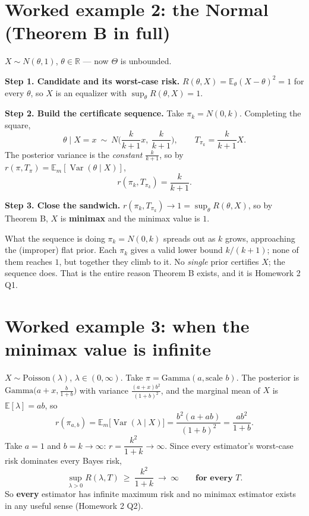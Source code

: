 \documentclass[11pt]{article}
\newcommand{\E}{\mathbb{E}}
\newcommand{\Var}{\operatorname{Var}}
\newcommand{\R}{\mathbb{R}}
\begin{document}
\section{Worked example 2: the Normal (Theorem B in full)}

$X\sim N(\theta,1)$, $\theta\in\R$ --- now $\Theta$ is unbounded.

\textbf{Step 1. Candidate and its worst-case risk.} $R(\theta,X)=\E_\theta(X-\theta)^2=1$ for
every $\theta$, so $X$ is an equalizer with $\sup_\theta R(\theta,X)=1$.

\textbf{Step 2. Build the certificate sequence.} Take $\pi_k=N(0,k)$. Completing the square,
\[
\theta\mid X=x\ \sim\ N\Big(\frac{k}{k+1}x,\ \frac{k}{k+1}\Big),
\qquad T_{\pi_k}=\frac{k}{k+1}X .
\]
The posterior variance is the \emph{constant} $\frac{k}{k+1}$, so by
$r(\pi,T_\pi)=\E_m[\Var(\theta\mid X)]$,
\[
r(\pi_k,T_{\pi_k})=\frac{k}{k+1}.
\]

\textbf{Step 3. Close the sandwich.} $r(\pi_k,T_{\pi_k})\to1=\sup_\theta R(\theta,X)$, so by
Theorem B, $X$ is \textbf{minimax} and the minimax value is $1$.

\begin{idea}{What the sequence is doing}
$\pi_k=N(0,k)$ spreads out as $k$ grows, approaching the (improper) flat prior. Each $\pi_k$
gives a valid lower bound $k/(k+1)$; none of them reaches $1$, but together they climb to it.
No \emph{single} prior certifies $X$; the sequence does. That is the entire reason Theorem B
exists, and it is Homework 2 Q1.
\end{idea}

\section{Worked example 3: when the minimax value is infinite}

$X\sim\mathrm{Poisson}(\lambda)$, $\lambda\in(0,\infty)$. Take $\pi=\mathrm{Gamma}(a,\text{scale }b)$.
The posterior is $\mathrm{Gamma}\big(a+x,\tfrac{b}{1+b}\big)$ with variance
$\frac{(a+x)b^2}{(1+b)^2}$, and the marginal mean of $X$ is $\E[\lambda]=ab$, so
\[
r(\pi_{a,b})=\E_m\big[\Var(\lambda\mid X)\big]=\frac{b^{2}(a+ab)}{(1+b)^{2}}=\frac{ab^{2}}{1+b}.
\]
Take $a=1$ and $b=k\to\infty$: $r=\dfrac{k^{2}}{1+k}\to\infty$. Since every estimator's
worst-case risk dominates every Bayes risk,
\[
\sup_{\lambda>0}R(\lambda,T)\ \ge\ \frac{k^{2}}{1+k}\ \longrightarrow\ \infty
\qquad\textbf{for every }T .
\]
So \textbf{every} estimator has infinite maximum risk and no minimax estimator exists in any
useful sense (Homework 2 Q2).
\end{document}
